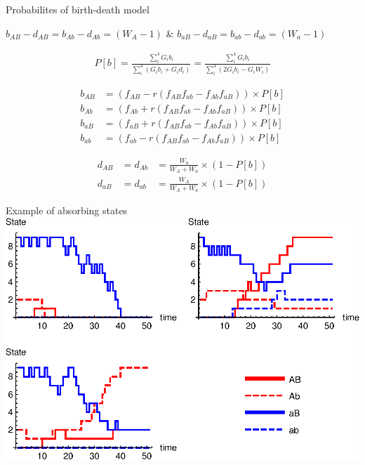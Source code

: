 \documentclass{beamer}
\begin{document}
\begin{frame}{Probabilites of birth-death model}

    $b_{AB}-d_{AB} = b_{Ab}-d_{Ab}=(W_A-1)$ \& $b_{aB}-d_{aB} = b_{ab}-d_{ab}=(W_a-1)$
    
    \begin{equation*}
    \begin{aligned}
        P[b] = \frac{\sum_i^4 G_i b_i}{\sum_i^4 (G_i b_i + G_i d_i)} = \frac{\sum_i^4 G_i b_i}{\sum_i^4 (2 G_i b_i - G_i W_i)}
    \end{aligned}
    \end{equation*}
    
    \begin{equation*}
    \begin{aligned}
        b_{AB} &= (f_{AB}-r(f_{AB}f_{ab}-f_{Ab}f_{aB}))\times P[b]\\
        b_{Ab} &= (f_{Ab}+r(f_{AB}f_{ab}-f_{Ab}f_{aB}))\times P[b]\\
        b_{aB} &= (f_{aB}+r(f_{AB}f_{ab}-f_{Ab}f_{aB}))\times P[b]\\
        b_{ab} &= (f_{ab}-r(f_{AB}f_{ab}-f_{Ab}f_{aB}))\times P[b]
    \end{aligned}
    \end{equation*} 
    
    \begin{equation*}
    \begin{aligned}
        d_{AB} &= d_{Ab} &= \frac{W_a}{W_A+W_a}\times (1-P[b]) \\
        d_{aB} &= d_{ab} &= \frac{W_A}{W_A+W_a}\times (1-P[b]) 
    \end{aligned}
    \end{equation*}
    
  
    
\end{frame}

\begin{frame}{Example of absorbing states}
    \includegraphics[width=1.0\textwidth]{Figures/gridplot.eps}
\end{frame}
\end{document}
